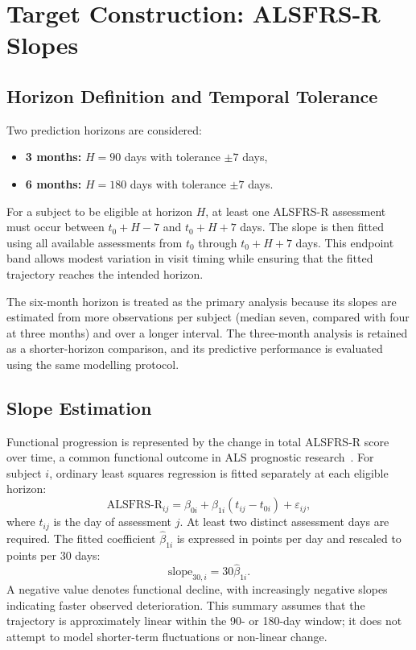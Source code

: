 \section{Target Construction: ALSFRS-R Slopes}
\label{sec:methods_targets}
\subsection{Horizon Definition and Temporal Tolerance}
\label{sec:methods_horizons}
Two prediction horizons are considered:
\begin{itemize}
  \item \textbf{3 months:} $H=90$ days with tolerance $\pm 7$ days,
  \item \textbf{6 months:} $H=180$ days with tolerance $\pm 7$ days.
\end{itemize}
For a subject to be eligible at horizon $H$, at least one \gls{ALSFRS-R} assessment must occur between $t_0+H-7$ and $t_0+H+7$ days. The slope is then fitted using all available assessments from $t_0$ through $t_0+H+7$ days. This endpoint band allows modest variation in visit timing while ensuring that the fitted trajectory reaches the intended horizon.

The six-month horizon is treated as the primary analysis because its slopes are estimated from more observations per subject (median seven, compared with four at three months) and over a longer interval. The three-month analysis is retained as a shorter-horizon comparison, and its predictive performance is evaluated using the same modelling protocol.

\subsection{Slope Estimation}
\label{sec:methods_slope}
Functional progression is represented by the change in total \gls{ALSFRS-R} score over time, a common functional outcome in \gls{ALS} prognostic research~\cite{Pancotti2022, Anani2024}. For subject $i$, ordinary least squares regression is fitted separately at each eligible horizon:
\[
  \mathrm{ALSFRS\mbox{-}R}_{ij}
  = \beta_{0i} + \beta_{1i}(t_{ij}-t_{0i}) + \varepsilon_{ij},
\]
where $t_{ij}$ is the day of assessment $j$. At least two distinct assessment days are required. The fitted coefficient $\hat{\beta}_{1i}$ is expressed in points per day and rescaled to points per 30 days:
\[
  \mathrm{slope}_{30,i}=30\hat{\beta}_{1i}.
\]
A negative value denotes functional decline, with increasingly negative slopes indicating faster observed deterioration. This summary assumes that the trajectory is approximately linear within the 90- or 180-day window; it does not attempt to model shorter-term fluctuations or non-linear change.

